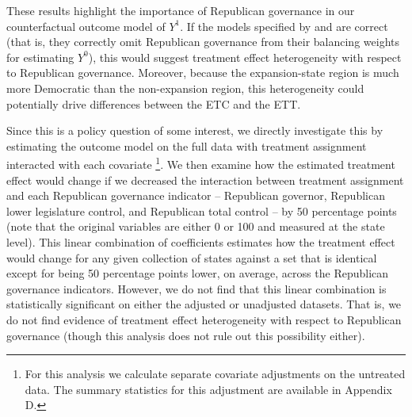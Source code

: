 These results highlight the importance of Republican governance in our counterfactual outcome model of $Y^1$. If the models specified by \cite{kaestner2017effects} and \cite{courtemanche2017early} are correct (that is, they correctly omit Republican governance from their balancing weights for estimating $Y^0$), this would suggest treatment effect heterogeneity with respect to Republican governance. Moreover, because the expansion-state region is much more Democratic than the non-expansion region, this heterogeneity could potentially drive differences between the ETC and the ETT.

Since this is a policy question of some interest, we directly investigate this by estimating the outcome model on the full data with treatment assignment interacted with each covariate \footnote{For this analysis we calculate separate covariate adjustments on the untreated data. The summary statistics for this adjustment are available in Appendix D.}. We then examine how the estimated treatment effect would change if we decreased the interaction between treatment assignment and each Republican governance indicator -- Republican governor, Republican lower legislature control, and Republican total control -- by 50 percentage points (note that the original variables are either 0 or 100 and measured at the state level). This linear combination of coefficients estimates how the treatment effect would change for any given collection of states against a set that is identical except for being 50 percentage points lower, on average, across the Republican governance indicators. However, we do not find that this linear combination is statistically significant on either the adjusted or unadjusted datasets. That is, we do not find evidence of treatment effect heterogeneity with respect to Republican governance (though this analysis does not rule out this possibility either).
